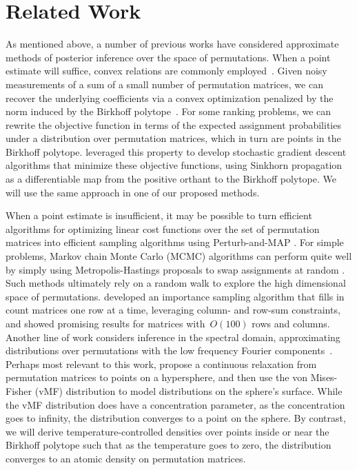 \section{Related Work}
\label{sec:relatedwork}

 As mentioned above, a
number of previous works have considered approximate methods of
posterior inference over the space of permutations. When a point
estimate will suffice, convex relations are commonly employed~\citep{fogel2013convex,
  lim2014beyond}. Given noisy measurements of a sum of a small number of
permutation matrices, we can recover the underlying coefficients
via a convex optimization penalized by the norm induced by the Birkhoff
polytope~\citep{chandrasekaran2012convex}.  For some ranking problems,
we can rewrite the objective function in terms of the expected 
assignment probabilities under a distribution over permutation matrices, which
in turn are points in the Birkhoff polytope. \citet{adams2011ranking}
leveraged this property to develop stochastic gradient descent algorithms
that minimize these objective functions, using Sinkhorn propagation~\citep{knight2008sinkhorn}
as a differentiable map from the positive orthant to the Birkhoff polytope.
We will use the same approach in one of our proposed methods. 


When a point estimate is insufficient, it may be possible to turn
efficient algorithms for optimizing linear cost functions over the set
of permutation matrices into efficient sampling algorithms using
Perturb-and-MAP \citep{li2013efficient}.  For simple problems, Markov
chain Monte Carlo (MCMC) algorithms can perform quite well by simply
using Metropolis-Hastings proposals to swap assignments at random
\citep{diaconis1988group}.  Such methods ultimately rely on a random
walk to explore the high dimensional space of permutations.
\citet{harrison2013importance} developed an importance sampling
algorithm that fills in count matrices one row at a time, leveraging
column- and row-sum constraints, and showed promising results for
matrices with~$O(100)$ rows and columns.  Another line of work
considers inference in the spectral domain, approximating
distributions over permutations with the low frequency Fourier
components~\citep{kondor2007multi, huang2009fourier}.  Perhaps most
relevant to this work, \citet{plis2011directional} propose a
continuous relaxation from permutation matrices to points on a
hypersphere, and then use the von Mises-Fisher (vMF) distribution to
model distributions on the sphere's surface. While the vMF
distribution does have a concentration parameter, as the concentration
goes to infinity, the distribution converges to a point on the sphere.
By contrast, we will derive temperature-controlled densities over
points inside or near the Birkhoff polytope such that as the temperature
goes to zero, the distribution converges to an atomic density on
permutation matrices.


